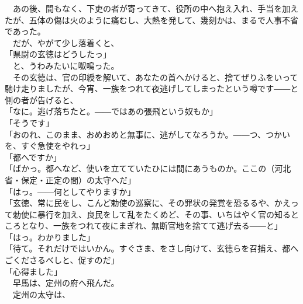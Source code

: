 \documentclass[
  paper=a5,
  fontsize=10pt,
  jafontsize=9.5pt,
  tate,                  %
  open_bracket_pos=nibu, %
]{jlreq}
\begin{document}
　あの後、間もなく、下吏の者が寄ってきて、役所の中へ抱え入れ、手当を加えたが、五体の傷は火のように痛むし、大熱を発して、幾刻かは、まるで人事不省であった。\\


　だが、やがて少し落着くと、\\


「県尉の玄徳はどうしたっ」\\


　と、うわみたいに呶鳴った。\\


　その玄徳は、官の印綬を解いて、あなたの首へかけると、捨てぜりふをいって馳け走りましたが、今宵、一族をつれて夜逃げしてしまったという噂です――と側の者が告げると、\\


「なに。逃げ落ちたと。――ではあの張飛という奴もか」\\


「そうです」\\


「おのれ、このまま、おめおめと無事に、逃がしてなろうか。――つ、つかいを、すぐ急使をやれっ」\\


「都へですか」\\


「ばかっ。都へなど、使いを立てていたひには間にあうものか。ここの（河北省・保定・正定の間）の太守へだ」\\


「はっ。――何としてやりますか」\\


「玄徳、常に民をし、こんど勅使の巡察に、その罪状の発覚を恐るるや、かえって勅使に暴行を加え、良民をして乱をたくめど、その事、いちはやく官の知るところとなり、一族をつれて夜にまぎれ、無断官地を捨てて逃げ去る――と」\\


「はっ。わかりました」\\


「待て。それだけではいかん。すぐさま、をさし向けて、玄徳らを召捕え、都へごくださるべしと、促すのだ」\\


「心得ました」\\


　早馬は、定州の府へ飛んだ。\\


　定州の太守は、\\
\end{document}
